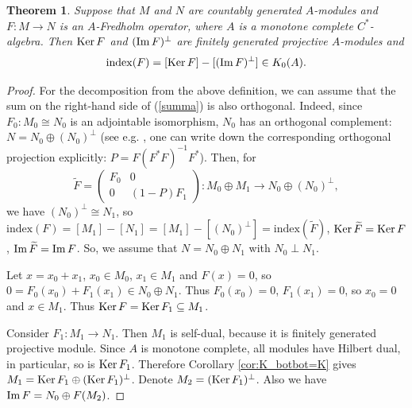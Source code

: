 \documentclass[12pt]{amsart}
\newtheorem{teo}{Theorem}%
\newcommand{\Ker}{\operatorname{Ker}}
\def\Ker{\mathop{\rm Ker}\nolimits}
\def\Im{\mathop{\rm Im}\nolimits}
\begin{document}
\begin{teo}\label{teo:Fredh}
Suppose that $M$ and $N$ are countably generated $A$-modules and $F:M\to N$ is an $A$-Fredholm operator, where $A$ is a monotone complete $C^*$-algebra.
Then $\Ker F$ and $(\Im F)^\bot$ are finitely generated projective $A$-modules and
$$
\mathrm{index}(F)=[\Ker F]-[(\Im F)^\bot]\in K_0(A).
$$	
\end{teo}

\begin{proof}
For the decomposition from the above definition, we can assume that the sum on the right-hand side of (\ref{summa}) is also orthogonal. Indeed,
since $F_0: {M}_0 \cong {N}_0$ is an adjointable isomorphism, ${N}_0$ has an orthogonal complement:
$N={N}_0  \oplus ({N}_0)^\bot$ (see e.g. \cite[Theorem 2.3.3]{MTBook}, one can write down the corresponding orthogonal projection explicitly: $P=F(F^*F)^{-1}F^*$). Then, for
\[
\widetilde{F}=
\left(\begin{matrix}
		F_0&0\\
		0& (1-P) F_1
	\end{matrix}\right): 
{M}_0 \oplus {M}_1   \to   {N}_0 \oplus ({N}_0)^\bot,
\]
we have $({N}_0)^\bot \cong  {N}_1$, so
$\mathrm{index}(F)=[M_1]-[N_1]=[M_1]-[({N}_0)^\bot]=\mathrm{index}(\widetilde{F})$,
$\Ker \widetilde{F}=\Ker F$, $\Im \widetilde{F}= \Im F$. So, we assume that ${N}={N}_0 \oplus {N}_1$ with $N_0\perp N_1$.

Let
$x=x_0+x_1$, $x_0\in {M}_0$, $x_1\in {M}_1$ and
$F(x)=0$, so $0=F_0(x_0)+F_1(x_1)\in {N}_0\oplus {N}_1$. Thus
$F_0(x_0)=0$, $F_1(x_1)=0$, so $x_0=0$ and $x\in {M}_1$. Thus
$\Ker F=\Ker F_1\subseteq {M}_1$. 

Consider $F_1:M_1 \to N_1$. Then $M_1$ is self-dual, because it is finitely generated projective module.
Since $A$ is monotone complete, all modules have Hilbert dual, in particular, so is $\Ker F_1$.
Therefore Corollary \ref{cor:K_botbot=K} gives $M_1=\Ker F_1 \oplus (\Ker F_1)^\bot$.
Denote $M_2=(\Ker F_1)^\bot$.
Also we have $\Im F = N_0 \oplus F(M_2)$.


\end{proof}
\end{document}

